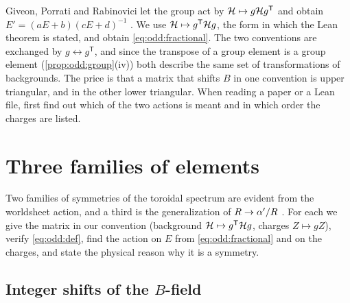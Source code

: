 \begin{pitfallbox}
Giveon, Porrati and Rabinovici let the group act by $\mathcal{H}\mapsto g\mathcal{H} g^{\mathsf T}$ and obtain
$E'=(aE+b)(cE+d)^{-1}$ . We use
$\mathcal{H}\mapsto g^{\mathsf T}\mathcal{H} g$, the form in which the Lean theorem
 is stated, and obtain \eqref{eq:odd:fractional}. The two
conventions are exchanged by $g\leftrightarrow g^{\mathsf T}$, and since the transpose of a
group element is a group element (\cref{prop:odd:group}(iv)) both describe the same set of
transformations of backgrounds. The price is that a matrix that shifts $B$ in one
convention is upper triangular, and in the other lower triangular. When reading a paper or
a Lean file, first find out which of the two actions is meant and in which order the
charges are listed.
\end{pitfallbox}

\section{Three families of elements}\label{sec:odd:generators}

Two families of symmetries of the toroidal spectrum are evident from the worldsheet action,
and a third is the generalization of $R\to\alpha'/R$ . For each we give the matrix in our convention
(background $\mathcal{H}\mapsto g^{\mathsf T}\mathcal{H} g$, charges $Z\mapsto gZ$), verify
\eqref{eq:odd:def}, find the action on $E$ from \eqref{eq:odd:fractional} and on the
charges, and state the physical reason why it is a symmetry.

\subsection{Integer shifts of the \texorpdfstring{$B$}{B}-field}

